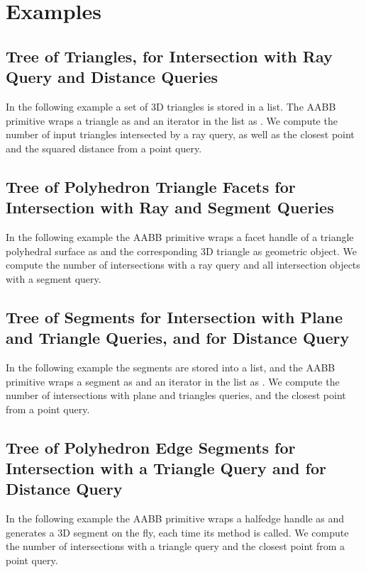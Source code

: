 \section{Examples}
\label{AABB_tree_section_examples}

\subsection{Tree of Triangles, for Intersection with Ray Query and Distance Queries}
In the following example a set of 3D triangles is stored in a list. The AABB primitive wraps a triangle as  and an iterator in the list as . We compute the number of input triangles intersected by a ray query, as well as the closest point and the squared distance from a point query.

\subsection{Tree of Polyhedron Triangle Facets for Intersection with Ray and Segment Queries}
In the following example the AABB primitive wraps a facet handle of a triangle polyhedral surface as  and the corresponding 3D triangle as geometric object. We compute the number of intersections with a ray query and all intersection objects with a segment query. 

\subsection{Tree of Segments for Intersection with Plane and Triangle Queries, and for Distance Query}
In the following example the segments are stored into a list, and the AABB primitive wraps a segment as  and an iterator in the list as . We compute the number of intersections with plane and triangles queries, and the closest point from a point query. 

\subsection{Tree of Polyhedron Edge Segments for Intersection with a Triangle Query and for Distance Query}
In the following example the AABB primitive wraps a halfedge handle as  and generates a 3D segment on the fly, each time its method  is called. We compute the number of intersections with a triangle query and the closest point from a point query. 
